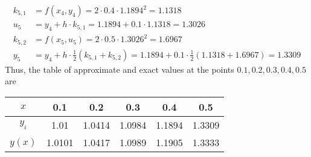 \documentclass{article}
\begin{document}
\begin{enumerate}
\begin{enumerate}[(a)]
\begin{soln}
\begin{align*}
						k_{5, 1} &= f(x_4, y_4) = 2\cdot 0.4\cdot 1.1894^2 = 1.1318 \\
						u_5 &= y_4 + h\cdot k_{5, 1} = 1.1894 + 0.1\cdot 1.1318 = 1.3026 \\
						k_{5, 2} &= f(x_5, u_5) = 2\cdot 0.5\cdot 1.3026^2 = 1.6967 \\
						y_5 &= y_4 + h\cdot \frac{1}{2}\left( k_{5, 1} + k_{5, 2} \right) = 1.1894 + 0.1\cdot \frac{1}{2}\left( 1.1318 + 1.6967 \right) = 1.3309
					\end{align*}
					Thus, the table of approximate and exact values at the points $0.1, 0.2, 0.3, 0.4, 0.5$ are
					\begin{center}
						\begin{tabular}{c||c|c|c|c|c}
							$x$ & 0.1 & 0.2 & 0.3 & 0.4 & 0.5 \\
							\hline
							$y_i$ & 1.01 & 1.0414 & 1.0984 & 1.1894 & 1.3309 \\
							\hline 
							$y(x)$ & 1.0101 & 1.0417 & 1.0989 & 1.1905 & 1.3333
						\end{tabular}
					\end{center}
				\end{soln}

		\end{enumerate}

\end{enumerate}
\end{document}
